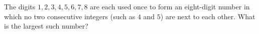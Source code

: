 The digits $1,2,3,4,5,6,7,8$ are each used once to form an eight-digit number in which no two consecutive integers (such as $4$ and $5$) are next to each other. What is the largest such number?
